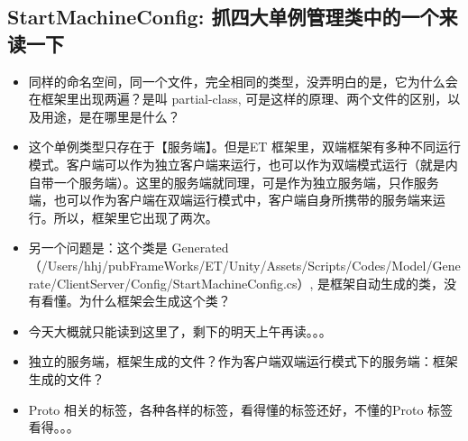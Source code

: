 \documentclass[9pt, b5paper]{article}
\begin{document}
\subsection{StartMachineConfig: 抓四大单例管理类中的一个来读一下}
\label{sec-1-9}
\begin{itemize}
\item 同样的命名空间，同一个文件，完全相同的类型，没弄明白的是，它为什么会在框架里出现两遍？是叫 partial-class, 可是这样的原理、两个文件的区别，以及用途，是在哪里是什么？
\item 这个单例类型只存在于【服务端】。但是ET 框架里，双端框架有多种不同运行模式。客户端可以作为独立客户端来运行，也可以作为双端模式运行（就是内自带一个服务端）。这里的服务端就同理，可是作为独立服务端，只作服务端，也可以作为客户端在双端运行模式中，客户端自身所携带的服务端来运行。所以，框架里它出现了两次。
\item 另一个问题是：这个类是 Generated （/Users/hhj/pubFrameWorks/ET/Unity/Assets/Scripts/Codes/Model/Generate/ClientServer/Config/StartMachineConfig.cs）, 是框架自动生成的类，没有看懂。为什么框架会生成这个类？
\item 今天大概就只能读到这里了，剩下的明天上午再读。。。
\item 独立的服务端，框架生成的文件？作为客户端双端运行模式下的服务端：框架生成的文件？
\item Proto 相关的标签，各种各样的标签，看得懂的标签还好，不懂的Proto 标签看得。。。
\end{itemize}
\end{document}

